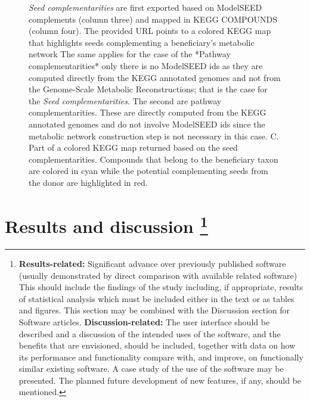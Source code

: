 \documentclass[sn-mathphys,Numbered]{sn-jnl}  %
\theoremstyle{thmstyleone}%
\theoremstyle{thmstyletwo}%
\theoremstyle{thmstylethree}%
\begin{document}
\begin{figure}[H]
{                \textit{Seed complementarities} are first exported based on ModelSEED complements (column three) and mapped in KEGG COMPOUNDS (column four).
                The provided URL points to a colored KEGG map that highlights seeds complementing a beneficiary's metabolic network
                The same applies for the case of the *Pathway complementarities* only there is no ModelSEED ids as they are computed directly from the KEGG annotated genomes and not from the Genome-Scale Metabolic Reconstructions; that is the case for the \textit{Seed complementarities}.
                The second are pathway complementarities. 
                These are directly computed from the KEGG annotated genomes and do not involve ModelSEED ids since the metabolic network construction step is not necessary in this case.
                C. Part of a colored KEGG map returned based on the seed complementarities. 
                Compounds that belong to the beneficiary taxon are colored in cyan while the potential complementing seeds from the donor are highlighted in red.
            }
            \label{fig:panels}
            \thispagestyle{empty} %
            \nolinenumbers %
        \end{figure}


\newpage

\section*{Results and discussion
\footnote{
    \textbf{Results-related: }
    Significant advance over previously published software (usually demonstrated by direct comparison with available related software)
    This should include the findings of the study including, if appropriate, results of statistical analysis which must be included either in the text or as tables and figures. 
    This section may be combined with the Discussion section for Software articles.
    \textbf{Discussion-related:}
    The user interface should be described and a discussion of the intended uses of the software, and the benefits that are envisioned, should be included, together with data on how its performance and functionality compare with, and improve, on functionally similar existing software. 
    A case study of the use of the software may be presented. 
    The planned future development of new features, if any, should be mentioned.
    }}
\label{sec:results-and-discussion}
\end{document}
